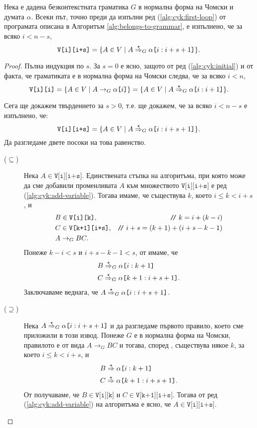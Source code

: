 \begin{lemma}
  Нека е дадена безконтекстната граматика $G$ в нормална форма на Чомски и думата $\alpha$.
  Всеки път, точно преди да изпълни ред (\ref{alg:cyk:first-loop}) от програмата описана в Алгоритъм \ref{alg:belongs-to-grammar},
  е изпълнено, че за всяко $i < n-s$,
  \[\texttt{V[i][i+s]} = \{A \in V \mid A \stackrel{{\star}}{\Rightarrow}_G \alpha\texttt{[}{i:i+s+1}\texttt{]}\}.\]
\end{lemma}
\begin{proof}
  Пълна индукция по $s$.
  За $s = 0$ е ясно, защото от ред (\ref{alg:cyk:initial}) и от факта, че граматиката е в нормална форма на Чомски следва, че за всяко $i < n$, 
  \[\texttt{V[i][i]} = \{A \in V \mid A \to_G \alpha\texttt{[}{i}\texttt{]}\} = \{A \in V \mid A \stackrel{{\star}}{\Rightarrow}_G \alpha\texttt{[}{i:i+1}\texttt{]}\}.\]
  
  Сега ще докажем твърдението за $s > 0$, т.е. ще докажем, че за всяко $i < n-s$ е изпълнено, че:
  \[\texttt{V[i][i+s]} = \{A \in V \mid A \stackrel{{\star}}{\Rightarrow}_G \alpha\texttt{[}{i:i+s+1}\texttt{]}\}.\]
  Да разгледаме двете посоки на това равенство.
  \begin{description}
  \item[($\subseteq$)]
    Нека $A \in \texttt{V[i][i+s]}$.
    Единствената стъпка на алгоритъма, при която може да сме добавили променливата $A$ към множеството $\texttt{V[i][i+s]}$ е ред (\ref{alg:cyk:add-variable}).
    Тогава имаме, че съществува $k$, което $i \leq k < i+s$, и 
    \begin{align*}
      & B \in \texttt{V[i][k]}, & \texttt{/}\!\texttt{/}\  k = i + (k - i)\\
      & C \in \texttt{V[k+1][i+s]}, & \texttt{/}\!\texttt{/}\  i + s = (k+1)+(i+s-k-1)\\
      & A\to_G BC.
    \end{align*}
    Понеже $k-i < s$ и $i + s - k - 1 < s$, от \IndHyp имаме, че
    \begin{align*}
      & B \stackrel{{\star}}{\Rightarrow}_G \alpha\texttt{[}{i:k+1}\texttt{]} \\
      & C \stackrel{{\star}}{\Rightarrow}_G \alpha\texttt{[}{k+1:i+s+1}\texttt{]}. 
    \end{align*}
    Заключаваме веднага, че $A \stackrel{{\star}}{\Rightarrow}_G \alpha\texttt{[}{i:i+s+1}\texttt{]}$.
  \item[($\supseteq$)]
    Нека $A \stackrel{{\star}}{\Rightarrow}_G \alpha\texttt{[}{i:i+s+1}\texttt{]}$ и да разгледаме първото правило, което сме приложили в този извод.
    Понеже $G$ е в нормална форма на Чомски, правилото е от вида $A \to_G BC$ и тогава, според , съществува някое $k$, за което $i \leq k < i+s$, и
    \begin{align*}
      & B \stackrel{{\star}}{\Rightarrow} \alpha\texttt{[}{i:k+1}\texttt{]} \\
      & C \stackrel{{\star}}{\Rightarrow} \alpha\texttt{[}{k+1:i+s+1}\texttt{]}.
    \end{align*}
    От \IndHyp получаваме, че $B \in \texttt{V[i][k]}$ и $C \in \texttt{V[k+1][i+s]}$.
    Тогава от ред (\ref{alg:cyk:add-variable}) на алгоритъма е ясно, че $A \in \texttt{V[i][i+s]}$.
  \end{description}
\end{proof}

